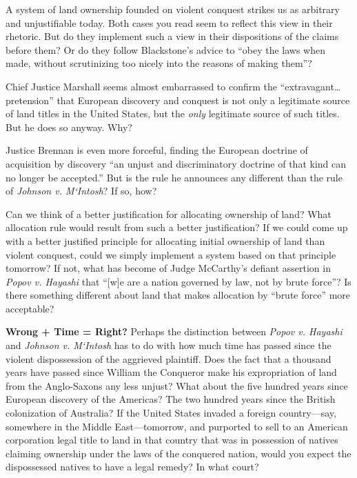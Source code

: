 
\item A system of land ownership founded on violent conquest strikes us as
arbitrary and unjustifiable today. Both cases you read seem to reflect this view
in their rhetoric. But do they implement such a view in their dispositions of
the claims before them? Or do they follow Blackstone's advice to ``obey the laws
when made, without scrutinizing too nicely into the reasons of making them''?

Chief Justice Marshall seems almost embarrassed to confirm the
``extravagant\ldots pretension'' that European discovery and conquest is not
only a legitimate source of land titles in the United States, but the
\textit{only} legitimate source of such titles. But he does so anyway. Why? 

Justice Brennan is even more forceful, finding the European doctrine of
acquisition by discovery ``an unjust and discriminatory doctrine of that kind
can no longer be accepted.'' But is the rule he announces any different than the
rule of \textit{Johnson v. M`Intosh}? If so, how?

Can we think of a better justification for allocating ownership of land? What
allocation rule would result from such a better justification? If we could come
up with a better justified principle for allocating initial ownership of land
than violent conquest, could we simply implement a system based on that
principle tomorrow? If not, what has become of Judge McCarthy's defiant
assertion in \textit{Popov v. Hayashi} that ``[w]e are a nation governed by law,
not by brute force''? Is there something different about land that makes
allocation by ``brute force'' more acceptable?


\item \textbf{Wrong + Time = Right?} Perhaps the distinction between
\textit{Popov v. Hayashi} and \textit{Johnson v. M`Intosh} has to do with how
much time has passed since the violent dispossession of the aggrieved plaintiff.
Does the fact that a thousand years have passed since William the Conqueror make
his expropriation of land from the Anglo-Saxons any less unjust? What about the
five hundred years since European discovery of the Americas? The two hundred
years since the British colonization of Australia? If the United States invaded
a foreign country---say, somewhere in the Middle East---tomorrow, and purported
to sell to an American corporation legal title to land in that country that was
in possession of natives claiming ownership under the laws of the conquered
nation, would you expect the dispossessed natives to have a legal remedy? In
what court?

